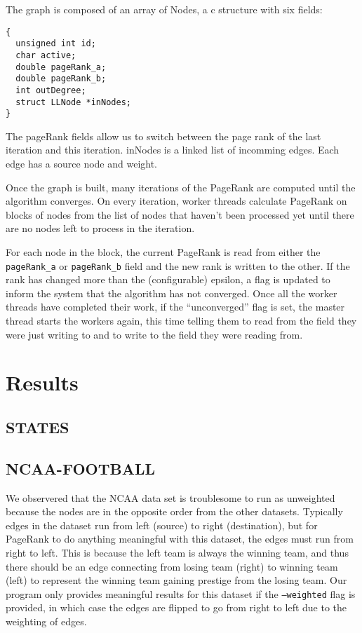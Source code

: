\documentclass{report}
\begin{document}
The graph is composed of an array of Nodes, a c structure with six fields:
\begin{lstlisting}[lang=ANSI]
{
  unsigned int id;
  char active;
  double pageRank_a;
  double pageRank_b;
  int outDegree;
  struct LLNode *inNodes;
}
\end{lstlisting}

The pageRank fields allow us to switch between the page rank of the last
iteration and this iteration. inNodes is a linked list of incomming edges. Each
edge has a source node and weight.

Once the graph is built, many iterations of the PageRank are computed until the
algorithm converges. On every iteration, worker threads calculate PageRank
on blocks of nodes from the list of nodes that haven't been processed yet until
there are no nodes left to process in the iteration.

For each node in the block, the current PageRank is read from either the
\texttt{pageRank\_a} or \texttt{pageRank\_b} field and the new rank is written
to the other. If the rank has changed more than the (configurable) epsilon, a
flag is updated to inform the system that the algorithm has not converged. Once
all the worker threads have completed their work, if the ``unconverged'' flag is
set, the master thread starts the workers again, this time telling them to read
from the field they were just writing to and to write to the field they were
reading from.

\section{Results}
\subsection{STATES}
\subsection{NCAA-FOOTBALL}
We observered that the NCAA data set is troublesome to run as unweighted because
the nodes are in the opposite order from the other datasets. Typically edges in
the dataset run from left (source) to right (destination), but for PageRank to
do anything meaningful with this dataset, the edges must run from right to left.
This is because the left team is always the winning team, and thus there should
be an edge connecting from losing team (right) to winning team (left) to
represent the winning team gaining prestige from the losing team. Our program
only provides meaningful results for this dataset if the \texttt{--weighted}
flag is provided, in which case the edges are flipped to go from right to left
due to the weighting of edges.
\end{document}
